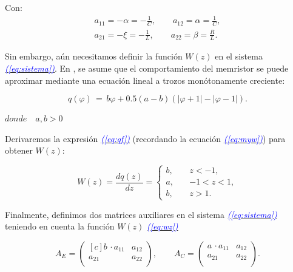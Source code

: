 \documentclass[12pt,a4paper]{report} %
\newcommand{\eref}[1]{\hyperref[#1]{\textcolor{blue}{\textit{(\ref*{#1})}}}}
\begin{document}
	Con:
	\begin{equation}
		\label{eq:amatriz}
	\begin{gathered}
		a_{11}=-\alpha=-\frac{1}{C}, \qquad a_{12}=\alpha=\frac{1}{C},\\[2mm]
		a_{21}=-\xi =-\frac{1}{L}, \qquad a_{22}=\beta = \frac{R}{L}.
	\end{gathered}
	\end{equation}\smallskip
	
	\vspace{0.5cm}\noindent Sin embargo, aún necesitamos definir la función $W(z)$ en el sistema \eref{eq:sistema}. En \cite{chuaoscillator2008}, se asume que el comportamiento del memristor se puede aproximar mediante una ecuación lineal a trozos monótonamente creciente:
	
	\begin{equation}
		q(\varphi)\,=\,b\varphi+0.5(a-b)(|\varphi+1|-|\varphi-1|).
		\label{eq:qf}
	\end{equation}
    \begin{center}
    	$ donde \quad a,b> 0$
    \end{center}
    
    \vspace{0.5cm}\noindent Derivaremos la expresión \eref{eq:qf} (recordando la ecuación \eref{eq:myw}) para obtener $W(z)$:

   \begin{equation}
    	W(z) = \frac{dq(z)}{dz} =
    	\begin{cases}
    			b,  \quad & z < -1, \\
    			a,  \quad & -1 < z < 1, \\
    			b,  \quad & z > 1.
    	\end{cases}
    	\label{eq:wz}
    \end{equation}\smallskip
    
    \noindent Finalmente, definimos dos matrices auxiliares en el sistema \eref{eq:sistema} teniendo en cuenta la función $W(z)$ \eref{eq:wz}
    
    \begin{equation}
    	A_E=\begin{pmatrix*}[c]
    		b \, \cdotp a_{11} & a_{12}\\
    	             a_{21} & a_{22}\\
    	\end{pmatrix*}, \qquad 	A_C=\begin{pmatrix*}
    	a \, \cdotp a_{11} & a_{12}\\
    	a_{21} & a_{22}\\
    	\end{pmatrix*}.
    \end{equation}\smallskip
    
\end{document}
